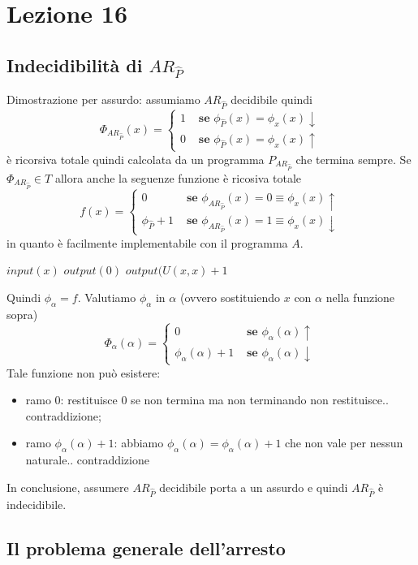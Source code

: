 \documentclass{article}
\begin{document}
\section{Lezione 16}
\subsection{Indecidibilità di $AR_{\hat{P}}$}
Dimostrazione per assurdo: assumiamo $AR_{\hat{P}}$ decidibile quindi
\begin{displaymath}
	\Phi_{AR_{\hat{P}}}(x)=\begin{cases}
		1 &\textbf{ se } \phi_{\hat{P}}(x)=\phi_x (x) \downarrow \\
		0 &\textbf{ se } \phi_{\hat{P}}(x)=\phi_x (x) \uparrow
	\end{cases}
\end{displaymath}
è ricorsiva totale quindi calcolata da un programma $P_{AR_{\hat{P}}}$ che termina sempre. Se $\Phi_{AR_{\hat{P}}} \in T$ allora anche la seguenze funzione è ricosiva totale
\begin{displaymath}
	f(x)=\begin{cases}
		0 &\textbf{ se } \phi_{AR_{\hat{P}}}(x)=0 \equiv \phi_x (x) \uparrow \\
		\phi_{\hat{P}}+1 &\textbf{ se } \phi_{AR_{\hat{P}}}(x)=1 \equiv \phi_x (x) \downarrow 
		
	\end{cases}
\end{displaymath}
in quanto è facilmente implementabile con il programma $A$.
\begin{algorithm}[!h]
	\caption{$A$}
        \begin{algorithmic}[1]
        		 \State $input(x)$
        		 	\State $output(0)$
        		 \Else
        		 	\State $output(U(x,x)+1$
        		 \EndIf
        \end{algorithmic}
    \end{algorithm}
    
Quindi $\phi_\alpha=f$. Valutiamo $\phi_\alpha$ in $\alpha$ (ovvero sostituiendo $x$ con $\alpha$ nella funzione sopra)
\begin{displaymath}
	\Phi_{\alpha}(\alpha)=\begin{cases}
		0 &\textbf{ se } \phi_\alpha (\alpha) \uparrow \\
		\phi_\alpha (\alpha)+1 &\textbf{ se } \phi_\alpha (\alpha) \downarrow 
		
	\end{cases}
\end{displaymath}
Tale funzione non può esistere: 
\begin{itemize}
	\item ramo 0: restituisce 0 se non termina ma non terminando non restituisce.. contraddizione;
	\item ramo $\phi_\alpha (\alpha)+1$: abbiamo $\phi_\alpha (\alpha) = \phi_\alpha (\alpha)+1$ che non vale per nessun naturale.. contraddizione
\end{itemize}
In conclusione, assumere $AR_{\hat{P}}$ decidibile porta a un assurdo e quindi $AR_{\hat{P}}$ è indecidibile.
\subsection{Il problema generale dell'arresto}
\end{document}
